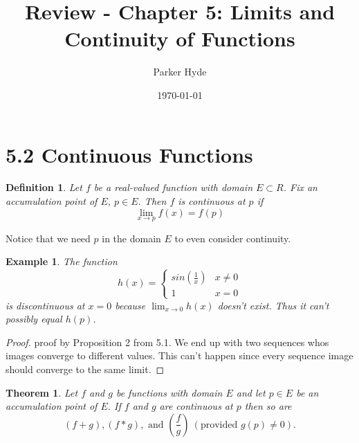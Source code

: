 \documentclass{article}
\begin{document}
\title{Review - Chapter 5: Limits and Continuity of Functions}
\author{Parker Hyde}
\date{\today}
\maketitle

\newtheorem{theorem}{Theorem}
\newtheorem{definition}{Definition}
\newtheorem{exmp}{Example}
\newtheorem{proposition}{Proposition}
\newtheorem{lemma}{Lemma}
\newtheorem{corollary}{Corollary}
\newtheorem{remark}{Remark}

\section*{5.2 Continuous Functions}

\begin{definition}
    Let \( f \) be a real-valued function with domain \( E \subset R \). Fix
    an accumulation point of \( E \), \( p \in E \).
    Then \( f\) is continuous at \( p \) if 
    \[
        \lim_{x \to p} f(x) = f(p)
    \] 
\end{definition}

Notice that we need \( p \) in the domain \( E \) to even consider continuity.

\begin{exmp}
    The function 
    \[
        h(x) = \begin{cases}
            sin(\frac{1}{x}) & x \ne 0 \\
            1 & x = 0
               \end{cases}
    \] 
    is discontinuous at \( x = 0 \) because \( \lim_{x \to 0} h(x) \) doesn't exist. Thus
    it can't possibly equal \( h(p)\).
\end{exmp}

\begin{proof}
   proof by Proposition 2 from 5.1. We end up with two sequences whos images converge to 
   different values. This can't happen since every sequence image should converge to the 
   same limit.
\end{proof}


\begin{theorem}
    Let \( f \) and \( g \) be functions with domain \( E \) and let \( p \in E\) be 
    an accumulation point of \( E \). If \( f \) and \( g \) are continuous at \( p \) 
    then so are
    \[
        (f+g), (f*g), \text{ and  } \left(\frac{f}{g}\right) \  (\text{provided  }g(p) \ne 0).
    \] 
\end{theorem}
\end{document}
